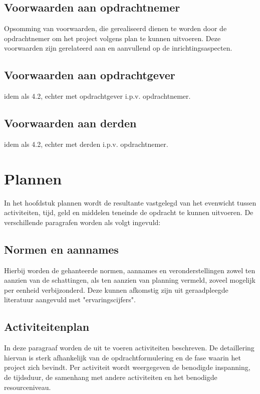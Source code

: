 \documentclass{article}
\begin{document}
\subsection{Voorwaarden aan opdrachtnemer}
Opsomming van voorwaarden, die gerealiseerd dienen te worden door de opdrachtnemer om het project volgens plan te kunnen uitvoeren.
Deze voorwaarden zijn gerelateerd aan en aanvullend op de inrichtingsaspecten.

\subsection{Voorwaarden aan opdrachtgever}

idem als 4.2, echter met opdrachtgever i.p.v. opdrachtnemer.

\subsection{Voorwaarden aan derden}

idem als 4.2, echter met derden i.p.v. opdrachtnemer.


\section{Plannen}
In het hoofdstuk plannen wordt de resultante vastgelegd van het evenwicht tussen activiteiten, tijd,
geld en middelen teneinde de opdracht te kunnen uitvoeren.
De verschillende paragrafen worden als volgt ingevuld:

\subsection{Normen en aannames}
Hierbij worden de gehanteerde normen, aannames en veronderstellingen zowel ten aanzien van de schattingen,
als ten aanzien van planning vermeld, zoveel mogelijk per eenheid verbijzonderd.
Deze kunnen afkomstig zijn uit geraadpleegde literatuur aangevuld met "ervaringscijfers".

\subsection{Activiteitenplan}
In deze paragraaf worden de uit te voeren activiteiten beschreven.
De detaillering hiervan is sterk afhankelijk van de opdrachtformulering en de fase waarin het project zich bevindt.
Per activiteit wordt weergegeven de benodigde inspanning, de tijdsduur,
de samenhang met andere activiteiten en het benodigde resourceniveau.
\end{document}

